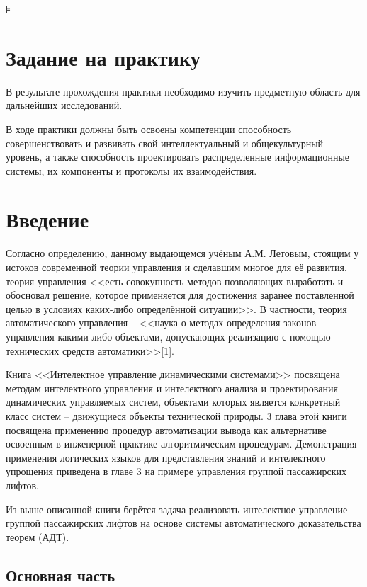 
\usepackage{hyperref,xcolor}




\setcounter{page}{2}
\tableofcontents⊧

\newpage
\section{Задание на практику }
В результате прохождения практики необходимо изучить предметную область для дальнейших исследований.

В ходе практики должны быть освоены компетенции способность совершенствовать и развивать свой интеллектуальный и общекультурный уровень, а также способность проектировать распределенные информационные системы, их компоненты и протоколы их взаимодействия.

\newpage
\section{Введение}

Согласно  определению, данному выдающемся учёным А.М. Летовым, стоящим у истоков современной теории управления и сделавшим многое для её развития, теория управления <<есть совокупность методов позволяющих выработать и обосновал решение, которое применяется для достижения заранее поставленной целью в условиях каких-либо определённой ситуации>>. В частности, теория автоматического управления -- <<наука о методах  определения законов управления какими-либо объектами, допускающих реализацию с помощью технических средств автоматики>>[1].

    Книга <<Интелектное управление динамическими системами>> посвящена методам интелектного управления и интелектного анализа и проектирования динамических управляемых систем, объектами которых является конкретный класс систем -- движущиеся объекты технической природы. 3 глава этой книги посвящена применению процедур автоматизации вывода как альтернативе освоенным в инженерной практике алгоритмическим процедурам. Демонстрация применения логических языков для представления знаний и интелектного упрощения приведена в главе 3 на примере управления группой пассажирских лифтов. 

    Из выше описанной книги берётся задача реализовать интелектное управление группой пассажирских лифтов на основе системы автоматического доказательства теорем (АДТ).

\subsection{Основная часть}

